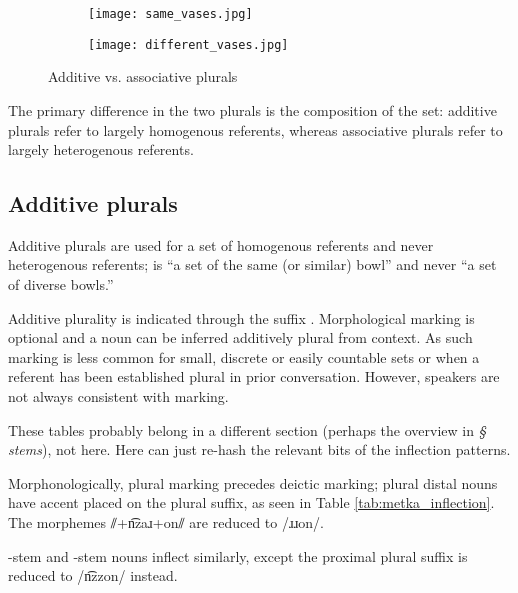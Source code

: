 \begin{figure}[h]
    \centering
    \begin{subfigure}{0.4\textwidth}
        \centering
        \texttt{[image: same\_vases.jpg]}
        \caption{}
    \end{subfigure}
    \begin{subfigure}{0.4\textwidth}
        \centering
        \texttt{[image: different\_vases.jpg]}
        \caption{}
    \end{subfigure}
    \caption{Additive vs. associative plurals}
\end{figure}

The primary difference in the two plurals is the composition of the set: additive plurals refer to largely homogenous referents, whereas associative plurals refer to largely heterogenous referents.

\subsection{Additive plurals}
Additive plurals are used for a set of homogenous referents and never heterogenous referents; \eg {} is “a set of the same (or similar) bowl” and never “a set of diverse bowls.”

Additive plurality is indicated through the suffix . Morphological marking is optional and a noun can be inferred additively plural from context.  As such marking is less common for small, discrete or easily countable sets or when a referent has been established plural in prior conversation. However, speakers are not always consistent with marking.

\begin{kaobox}[frametitle=\sc todo:]
    These tables probably belong in a different section (perhaps the overview in \emph{§ stems}), not here. Here can just re-hash the relevant bits of the inflection patterns.
\end{kaobox}

Morphonologically, plural marking precedes deictic marking; plural distal nouns have accent placed on the plural suffix, as seen in Table \ref{tab:metka_inflection}. The morphemes ⫽+n͡zaɹ+on⫽ are reduced to /ɹɹon/.

-stem and -stem nouns inflect similarly, except the proximal plural suffix is reduced to /n͡zzon/ instead.

